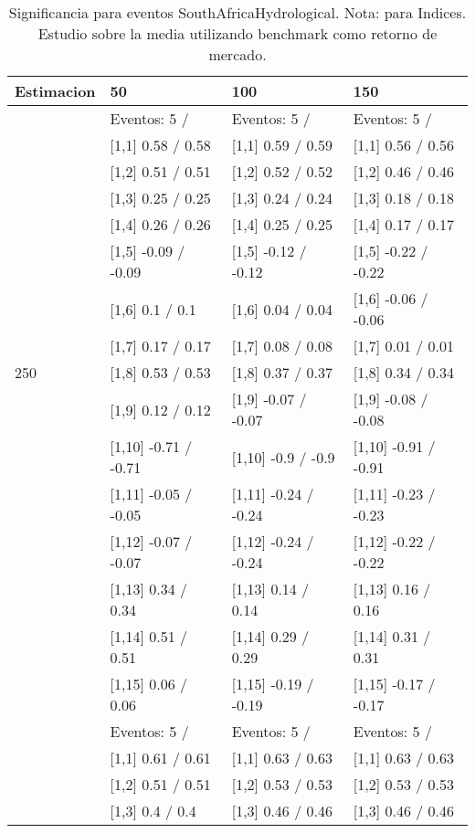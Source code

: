 \begin{table}

\caption{Significancia para eventos SouthAfricaHydrological. Nota: para Indices. Estudio sobre la media utilizando benchmark como retorno de mercado.}
\centering
\begin{tabular}[t]{llll}
\toprule
Estimacion & 50 & 100 & 150\\
\midrule
 & Eventos:  5 / & Eventos:  5 / & Eventos:  5 /\\
 & {}[1,1] 0.58  / 0.58 & {}[1,1] 0.59  / 0.59 & {}[1,1] 0.56  / 0.56\\
 & {}[1,2] 0.51  / 0.51 & {}[1,2] 0.52  / 0.52 & {}[1,2] 0.46  / 0.46\\
 & {}[1,3] 0.25  / 0.25 & {}[1,3] 0.24  / 0.24 & {}[1,3] 0.18  / 0.18\\
 & {}[1,4] 0.26  / 0.26 & {}[1,4] 0.25  / 0.25 & {}[1,4] 0.17  / 0.17\\
\addlinespace
 & {}[1,5] -0.09  / -0.09 & {}[1,5] -0.12  / -0.12 & {}[1,5] -0.22  / -0.22\\
 & {}[1,6] 0.1  / 0.1 & {}[1,6] 0.04  / 0.04 & {}[1,6] -0.06  / -0.06\\
 & {}[1,7] 0.17  / 0.17 & {}[1,7] 0.08  / 0.08 & {}[1,7] 0.01  / 0.01\\
250 & {}[1,8] 0.53  / 0.53 & {}[1,8] 0.37  / 0.37 & {}[1,8] 0.34  / 0.34\\
 & {}[1,9] 0.12  / 0.12 & {}[1,9] -0.07  / -0.07 & {}[1,9] -0.08  / -0.08\\
\addlinespace
 & {}[1,10] -0.71  / -0.71 & {}[1,10] -0.9  / -0.9 & {}[1,10] -0.91  / -0.91\\
 & {}[1,11] -0.05  / -0.05 & {}[1,11] -0.24  / -0.24 & {}[1,11] -0.23  / -0.23\\
 & {}[1,12] -0.07  / -0.07 & {}[1,12] -0.24  / -0.24 & {}[1,12] -0.22  / -0.22\\
 & {}[1,13] 0.34  / 0.34 & {}[1,13] 0.14  / 0.14 & {}[1,13] 0.16  / 0.16\\
 & {}[1,14] 0.51  / 0.51 & {}[1,14] 0.29  / 0.29 & {}[1,14] 0.31  / 0.31\\
\addlinespace
 & {}[1,15] 0.06  / 0.06 & {}[1,15] -0.19  / -0.19 & {}[1,15] -0.17  / -0.17\\
 & Eventos:  5 / & Eventos:  5 / & Eventos:  5 /\\
 & {}[1,1] 0.61  / 0.61 & {}[1,1] 0.63  / 0.63 & {}[1,1] 0.63  / 0.63\\
 & {}[1,2] 0.51  / 0.51 & {}[1,2] 0.53  / 0.53 & {}[1,2] 0.53  / 0.53\\
 & {}[1,3] 0.4  / 0.4 & {}[1,3] 0.46  / 0.46 & {}[1,3] 0.46  / 0.46\\

\end{tabular}
\end{table}
